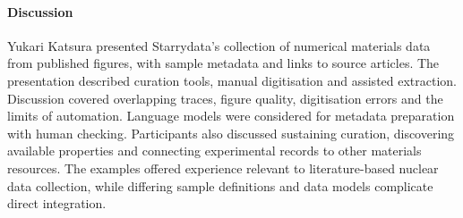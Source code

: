 \paragraph{Discussion}
Yukari Katsura presented Starrydata's collection of numerical materials data from published figures, with sample metadata and links to source articles. The presentation described curation tools, manual digitisation and assisted extraction. Discussion covered overlapping traces, figure quality, digitisation errors and the limits of automation. Language models were considered for metadata preparation with human checking. Participants also discussed sustaining curation, discovering available properties and connecting experimental records to other materials resources. The examples offered experience relevant to literature-based nuclear data collection, while differing sample definitions and data models complicate direct integration.
